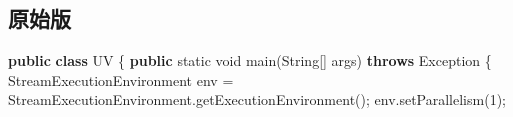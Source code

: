 \documentclass[cn,11pt,chinese]{elegantbook}
\newenvironment{Shaded}{}{}
\newcommand{\BuiltInTok}[1]{#1}
\newcommand{\DataTypeTok}[1]{\textcolor[rgb]{0.56,0.13,0.00}{#1}}
\newcommand{\DecValTok}[1]{\textcolor[rgb]{0.25,0.63,0.44}{#1}}
\newcommand{\FunctionTok}[1]{\textcolor[rgb]{0.02,0.16,0.49}{#1}}
\newcommand{\KeywordTok}[1]{\textcolor[rgb]{0.00,0.44,0.13}{\textbf{#1}}}
\newcommand{\NormalTok}[1]{#1}
\begin{document}
\hypertarget{ux539fux59cbux7248}{%
\subsection{原始版}\label{ux539fux59cbux7248}}

\begin{Shaded}
\begin{Highlighting}[]
\KeywordTok{public} \KeywordTok{class}\NormalTok{ UV \{}
    \KeywordTok{public} \DataTypeTok{static} \DataTypeTok{void} \FunctionTok{main}\NormalTok{(}\BuiltInTok{String}\NormalTok{[] args) }\KeywordTok{throws} \BuiltInTok{Exception}\NormalTok{ \{}
\NormalTok{        StreamExecutionEnvironment env = StreamExecutionEnvironment.}\FunctionTok{getExecutionEnvironment}\NormalTok{();}
\NormalTok{        env.}\FunctionTok{setParallelism}\NormalTok{(}\DecValTok{1}\NormalTok{);}


\end{Highlighting}
\end{Shaded}
\end{document}
